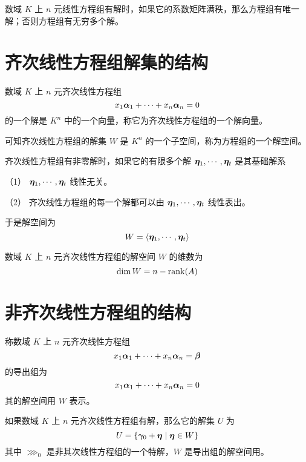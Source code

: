\begin{theorem}
	数域 $K$ 上 $n$ 元线性方程组有解时，如果它的系数矩阵满秩，那么方程组有唯一解；否则方程组有无穷多个解。
\end{theorem}

\section{齐次线性方程组解集的结构}

数域 $K$ 上 $n$ 元齐次线性方程组
$$x_1\boldsymbol{\alpha}_1 + \cdots + x_n\boldsymbol{\alpha}_n = 0$$
的一个解是 $K^n$ 中的一个向量，称它为齐次线性方程组的一个解向量。

可知齐次线性方程组的解集 $W$ 是 $K^n$ 的一个子空间，称为方程组的一个解空间。

\begin{definition}
	齐次线性方程组有非零解时，如果它的有限多个解 $\boldsymbol{\eta}_1,\cdots,\boldsymbol{\eta}_t$ 是其基础解系

	（1） $\boldsymbol{\eta}_1,\cdots,\boldsymbol{\eta}_t$ 线性无关。

	（2） 齐次线性方程组的每一个解都可以由 $\boldsymbol{\eta}_1,\cdots,\boldsymbol{\eta}_t$ 线性表出。
\end{definition}

于是解空间为
$$W = \langle \boldsymbol{\eta}_1,\cdots,\boldsymbol{\eta}_t \rangle$$

\begin{theorem}
	数域 $K$ 上 $n$ 元齐次线性方程组的解空间 $W$ 的维数为
	$$\dim W = n-\operatorname{rank}(A)$$
\end{theorem}

\section{非齐次线性方程组的结构}

称数域 $K$ 上 $n$ 元齐次线性方程组
$$x_1\boldsymbol{\alpha}_1 + \cdots + x_n\boldsymbol{\alpha}_n = \boldsymbol{\beta}$$
的导出组为
$$x_1\boldsymbol{\alpha}_1 + \cdots + x_n\boldsymbol{\alpha}_n = 0$$
其的解空间用 $W$ 表示。

\begin{theorem}
	如果数域 $K$ 上 $n$ 元齐次线性方程组有解，那么它的解集 $U$ 为
	$$U = \{\boldsymbol{\gamma}_0+\boldsymbol{\eta} \mid \boldsymbol{\eta} \in W\}$$
	其中 $\ggg_0$ 是非其次线性方程组的一个特解，$W$ 是导出组的解空间用。
\end{theorem}









